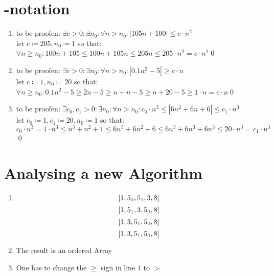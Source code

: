 \documentclass[sectionformat = exercise]{gadsescript}
\begin{document}
\section{-notation}
\begin{enumerate}[label=\alph*)]
	\item to be proofen: $ \exists c > 0 : \exists n_0 : \forall n > n_0 : |105n + 100| \leq c \cdot n^2$\\
		let $ c \coloneqq 205, n_0 \coloneqq 1 $ so that:\\
		$ \forall n \geq n_0: 100 n + 105 \leq 100n + 105n \leq 205n \leq 205 \cdot n^2 = c \cdot n^2 $\qed
	\item to be proofen: $ \exists c > 0 : \exists n_0 : \forall n > n_0 : |0.1n^2 -5| \geq c \cdot n$\\
		let $ c \coloneqq 1, n_0 \coloneqq 20 $ so that:\\
		$ \forall n \geq n_0: 0.1 n^2 - 5 \geq 2 n - 5 \geq n + n - 5 \geq n + 20 - 5 \geq 1 \cdot n = c \cdot n $\qed
	\item to be proofen: $ \exists c_0, c_1 > 0 : \exists n_0 : \forall n > n_0 : c_0 \cdot n^3 \leq |6n^2 + 6n + 6| \leq c_1 \cdot n^3$\\
		let $ c_0 \coloneqq 1, c_1 \coloneqq 20, n_0 \coloneqq 1 $ so that:\\
		$ c_0 \cdot n^3 = 1 \cdot n^3 \leq n^3 + n^2 + 1 \leq 6n^3 + 6n^2 + 6 \leq 6n^3 + 6n^3 + 6n^3 \leq 20 \cdot n^3 = c_1 \cdot n^3 $\qed
\end{enumerate}

\section{Analysing a new Algorithm}
\begin{enumerate}[label=\alph*)]
	\item 
		\[ [ 1, 5_{\color{violet} 0}, 5_{\color{violet} 1}, 3, 8 ] \]
		\[ [ 1, 5_{\color{violet} 1}, 3, 5_{\color{violet} 0}, 8 ] \]
		\[ [ 1, 3, 5_{\color{violet} 1}, 5_{\color{violet} 0}, 8 ] \]
		\[ [ 1, 3, 5_{\color{violet} 1}, 5_{\color{violet} 0}, 8 ] \]
	\item The result is an ordered Array
	\item One has to change the $\geq$ sign in line 4 to $ > $
\end{enumerate}
\end{document}
